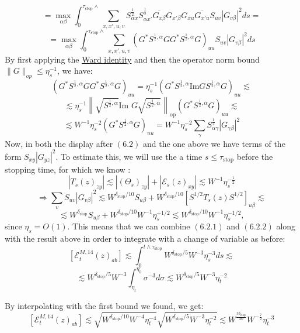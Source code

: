 \documentclass[11pt]{article}
\newcommand{\E}{\mathcal{E}}
\newcommand{\sto}{\text{stop}}
\newcommand{\im}{\text{Im }}
\begin{document}
\begin{equation*}=\max_{\alpha\beta}\int_0^{\tau_\sto\wedge}\sum_{x, x', u, v}S^{\frac{1}{2}}_{\alpha x}S^{\frac{1}{2}}_{\alpha x'}\overline{G_{x\beta}}G_{x'\beta}G_{xu}\overline{G_{x'u}}S_{uv}|G_{v\beta}|^2ds=\tag{6.2}\end{equation*}
\begin{equation*}=\max_{\alpha\beta}\int_0^{\tau_\sto\wedge}\sum_{x, x', u, v}\left(G^*S^{\frac{1}{2}, \alpha}GG^*S^{\frac{1}{2},\alpha}G\right)_{uu}S_{uv}|G_{v\beta}|^2ds\tag{6.2.1}\end{equation*}
By first applying the \hyperref[ward]{Ward identity} and then the operator norm bound $\|G\|_{op}\leq \eta_s^{-1}$, we have: 
$$\left(G^*S^{\frac{1}{2}, \alpha}GG^*S^{\frac{1}{2},\alpha}G\right)_{uu} = \eta_s^{-1}\left(G^*S^{\frac{1}{2}, \alpha}\text{Im}GS^{\frac{1}{2},\alpha}G\right)_{uu}\lesssim$$
$$\lesssim \eta_s^{-1}\left\|\sqrt{S^{\frac{1}{2}, \alpha}}\im G\sqrt{S^{\frac{1}{2}, \alpha}}\right\|_{\mathrm{op}}(G^*S^{\frac{1}{2}, \alpha}G)_{uu}\lesssim$$
\begin{equation*}\lesssim W^{-1}\eta_s^{-2}(G^*S^{\frac{1}{2}, \alpha}G)_{uu} = W^{-1}\eta_s^{-2}\sum_\gamma S^{\frac{1}{2}}_{\alpha\gamma}|G_{\gamma\beta}|^2\tag{6.2.2}\end{equation*}
Now, in both the display after $(6.2)$ and the one above we have terms of the form $S_{xy}|G_{yz}|^2$. To estimate this, we will use the a time $s\leq \tau_\sto$ before the stopping time, for which we know \cite{bandSDE}: $$|T_s(z)_{zy}|\lesssim |(\Theta_s)_{zy}|+|\E_s(z)_{xy}|\lesssim W^{-1}\eta_s^{-\frac{1}{2}}$$
$$\Rightarrow \sum_v S_{uv}|G_{v\beta}|^2\lesssim W^{\delta_\sto/10}S_{u\beta}+W^{\delta_\sto/10}\left[S^{1/2}T_s(z)S^{1/2}\right]_{u\beta}\lesssim$$ 
$$\lesssim W^{\delta_\sto}S_{u\beta} + W^{\delta_\sto/10}W^{-1}\eta_s^{-1/2}\lesssim W^{\delta_\sto/10}W^{-1}\eta_s^{-1/2},$$
since $\eta_s = O(1)$. This means that we can combine $(6.2.1)$ and $(6.2.2)$ along with the result above in order to integrate with a change of variable as before: \newpage
$$\left[\E_t^{M, 14}(z)_{ab}\right]\lesssim \int_0^{t\wedge \tau_\sto} W^{\delta_\sto/5}W^{-3}\eta_s^{-3}ds\lesssim$$
$$\lesssim W^{\delta_\sto/5}W^{-3}\int_{\eta_t}^{\eta_0}\sigma^{-3}d\sigma\lesssim W^{\delta_\sto/5}W^{-3}\eta_t^{-2}$$

By interpolating with the first bound we found, we get: 
$$\left[\E_t^{M, 14}(z)_{ab}\right] \lesssim \sqrt{ W^{\delta_\sto/10}W^{-4}\eta_t^{-4}}\sqrt{W^{\delta_\sto/5}W^{-3}\eta_t^{-2}}\lesssim W^{\frac{3\delta_\sto}{20}}W^{-\frac{7}{2}}\eta_t^{-3}$$
\end{document}
